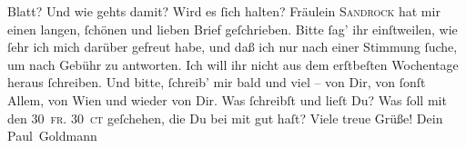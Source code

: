 \begin{ledgroupsized}[t]{13cm}
                  Blatt? Und wie gehts damit?
               Wird es ſich halten?\pend
           \pstart
           Fräulein \textsc{Sandrock} hat mir einen langen, ſchönen und lieben Brief geſchrieben. Bitte ſag’ ihr
               einſtweilen, wie ſehr ich mich darüber gefreut habe, und daß ich nur nach einer
               Stimmung ſuche, um nach Gebühr zu antworten. Ich will ihr nicht aus dem erſtbeſten
               Wochentage heraus ſchreiben.\pend
           \pstart
           Und bitte, ſchreib’ mir bald und viel – von Dir, von ſonſt Allem, von Wien und wieder von Dir. Was ſchreibſt und lieſt
               Du? Was ſoll mit den \textsc{30 fr. 30 ct} geſchehen, die Du bei mit
               gut haſt? Viele treue Grüße! Dein\pend
           \pstart \spacefill\mbox{Paul Goldmann}\pend{}
         
         \endnumbering{}\end{ledgroupsized}  \newcommand{\dateiname}{L02620}\newcommand{\titel}{Paul Goldmann an Arthur Schnitzler, 18. 11. 1894}\newcommand{\editorInnen}{Martin Anton Müller und Laura Untner}
      